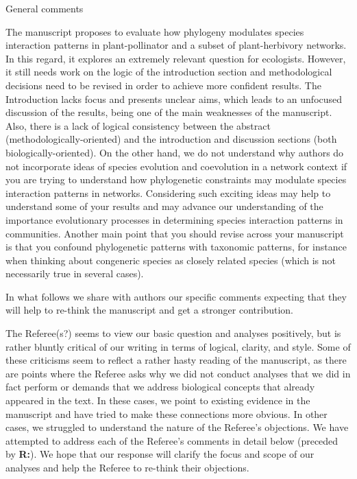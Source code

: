 \documentclass[12pt]{letter}
\newenvironment{refquote}{\bigskip \begin{it}}{\end{it}\smallskip}
\begin{document}
	\begin{refquote}
	General comments

	The manuscript proposes to evaluate how phylogeny modulates species interaction patterns in plant-pollinator and a subset of plant-herbivory networks. In this regard, it explores an extremely relevant question for ecologists. However, it still needs work on the logic of the introduction section and methodological decisions need to be revised in order to achieve more confident results. The Introduction lacks focus and presents unclear aims, which leads to an unfocused discussion of the results, being one of the main weaknesses of the manuscript. Also, there is a lack of logical consistency between the abstract (methodologically-oriented) and the introduction and discussion sections (both biologically-oriented). On the other hand, we do not understand why authors do not incorporate ideas of species evolution and coevolution in a network context if you are trying to understand how phylogenetic constraints may modulate species interaction patterns in networks. Considering such exciting ideas may help to understand some of your results and may advance our understanding of  the importance evolutionary processes in determining species interaction patterns in communities.
	Another main point that you should revise across your manuscript is that you confound phylogenetic patterns with taxonomic patterns, for instance when thinking about congeneric species as closely related species (which is not necessarily true in several cases).

	\smallskip

	In what follows we share with authors our specific comments expecting that they will help to re-think the manuscript and get a stronger contribution.

	\end{refquote}


	The Referee(s?) seems to view our basic question and analyses positively, but is rather bluntly critical of our writing in terms of logical, clarity, and style. Some of these criticisms seem to reflect a rather hasty reading of the manuscript, as there are points where the Referee asks why we did not conduct analyses that we did in fact perform or demands that we address biological concepts that already appeared in the text. In these cases, we point to existing evidence in the manuscript and have tried to make these connections more obvious. In other cases, we struggled to understand the nature of the Referee's objections. We have attempted to address each of the Referee's comments in detail below (preceded by \textbf{R:}). We hope that our response will clarify the focus and scope of our analyses and help the Referee to re-think their objections.
\end{document}
